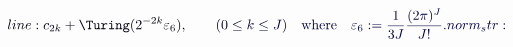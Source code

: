 \documentclass[12pt]{article}
\begin{document}
\makeatletter
\renewcommand*{\@textcolor}[3]{%
  \protect\leavevmode
  \begingroup
    \color#1{#2}#3%
  \endgroup
}
\makeatother
\begin{displaymath}
\mathcolor[RGB]{0,0,15}{line:
c_{2k}+\Turing(2^{-2k}\varepsilon_6),\qquad} \mathcolor[RGB]{0,0,30}{(0\le} \mathcolor[RGB]{0,0,45}{k\le} \mathcolor[RGB]{0,0,60}{J)\quad\text{where}\quad\varepsilon_6:=\frac{1}{3J}\frac{(2\pi)^J}{J!}.

norm_str:}
\end{displaymath}
\end{document}

